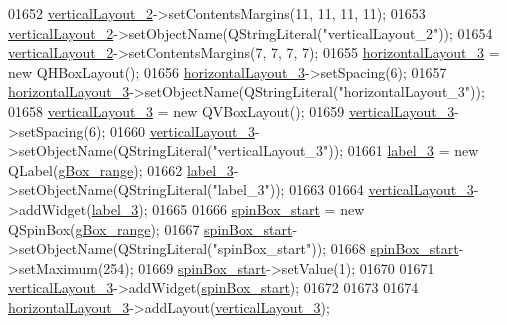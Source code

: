 \begin{DoxyCode}
01652         \hyperlink{a00080_a0c01bad60d9f422a1258e710635a2f65}{verticalLayout\_2}->setContentsMargins(11, 11, 11, 11);
01653         \hyperlink{a00080_a0c01bad60d9f422a1258e710635a2f65}{verticalLayout\_2}->setObjectName(QStringLiteral(\textcolor{stringliteral}{"verticalLayout\_2"}));
01654         \hyperlink{a00080_a0c01bad60d9f422a1258e710635a2f65}{verticalLayout\_2}->setContentsMargins(7, 7, 7, 7);
01655         \hyperlink{a00080_a03ce63974cc69b067c91bbf285cceca8}{horizontalLayout\_3} = \textcolor{keyword}{new} QHBoxLayout();
01656         \hyperlink{a00080_a03ce63974cc69b067c91bbf285cceca8}{horizontalLayout\_3}->setSpacing(6);
01657         \hyperlink{a00080_a03ce63974cc69b067c91bbf285cceca8}{horizontalLayout\_3}->setObjectName(QStringLiteral(\textcolor{stringliteral}{"horizontalLayout\_3"}));
01658         \hyperlink{a00080_a38b8a4b887f3b58e2a49e7905ae6f1f0}{verticalLayout\_3} = \textcolor{keyword}{new} QVBoxLayout();
01659         \hyperlink{a00080_a38b8a4b887f3b58e2a49e7905ae6f1f0}{verticalLayout\_3}->setSpacing(6);
01660         \hyperlink{a00080_a38b8a4b887f3b58e2a49e7905ae6f1f0}{verticalLayout\_3}->setObjectName(QStringLiteral(\textcolor{stringliteral}{"verticalLayout\_3"}));
01661         \hyperlink{a00080_a0376fd90247280e7c7957cc70628708c}{label\_3} = \textcolor{keyword}{new} QLabel(\hyperlink{a00080_a3c12d0504a310784c3820d1a9ad469c2}{gBox\_range});
01662         \hyperlink{a00080_a0376fd90247280e7c7957cc70628708c}{label\_3}->setObjectName(QStringLiteral(\textcolor{stringliteral}{"label\_3"}));
01663 
01664         \hyperlink{a00080_a38b8a4b887f3b58e2a49e7905ae6f1f0}{verticalLayout\_3}->addWidget(\hyperlink{a00080_a0376fd90247280e7c7957cc70628708c}{label\_3});
01665 
01666         \hyperlink{a00080_acb4d6609c580645dac5aee1f1ad59d01}{spinBox\_start} = \textcolor{keyword}{new} QSpinBox(\hyperlink{a00080_a3c12d0504a310784c3820d1a9ad469c2}{gBox\_range});
01667         \hyperlink{a00080_acb4d6609c580645dac5aee1f1ad59d01}{spinBox\_start}->setObjectName(QStringLiteral(\textcolor{stringliteral}{"spinBox\_start"}));
01668         \hyperlink{a00080_acb4d6609c580645dac5aee1f1ad59d01}{spinBox\_start}->setMaximum(254);
01669         \hyperlink{a00080_acb4d6609c580645dac5aee1f1ad59d01}{spinBox\_start}->setValue(1);
01670 
01671         \hyperlink{a00080_a38b8a4b887f3b58e2a49e7905ae6f1f0}{verticalLayout\_3}->addWidget(\hyperlink{a00080_acb4d6609c580645dac5aee1f1ad59d01}{spinBox\_start});
01672 
01673 
01674         \hyperlink{a00080_a03ce63974cc69b067c91bbf285cceca8}{horizontalLayout\_3}->addLayout(\hyperlink{a00080_a38b8a4b887f3b58e2a49e7905ae6f1f0}{verticalLayout\_3});

\end{DoxyCode}
